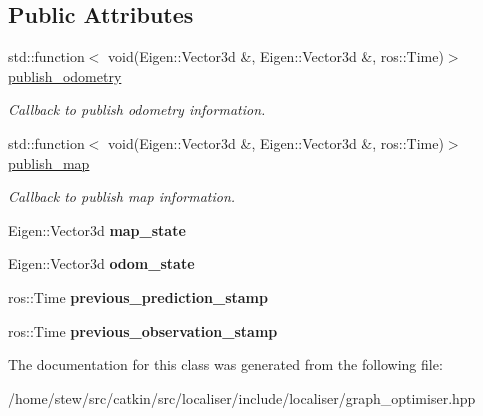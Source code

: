 \subsection*{Public Attributes}
\begin{DoxyCompactItemize}
\item 
\mbox{\label{classLocalisationMethod_a0a86db738ecb379804ed9d76de46ffb9}} 
std\+::function$<$ void(Eigen\+::\+Vector3d \&, Eigen\+::\+Vector3d \&, ros\+::\+Time)$>$ \hyperlink{classLocalisationMethod_a0a86db738ecb379804ed9d76de46ffb9}{publish\+\_\+odometry}
\begin{DoxyCompactList}\small\item\em Callback to publish odometry information. \end{DoxyCompactList}\item 
\mbox{\label{classLocalisationMethod_a51eb7bef9c72bb0cd2e9331ad3080110}} 
std\+::function$<$ void(Eigen\+::\+Vector3d \&, Eigen\+::\+Vector3d \&, ros\+::\+Time)$>$ \hyperlink{classLocalisationMethod_a51eb7bef9c72bb0cd2e9331ad3080110}{publish\+\_\+map}
\begin{DoxyCompactList}\small\item\em Callback to publish map information. \end{DoxyCompactList}\item 
\mbox{\label{classLocalisationMethod_a18a06e2d38902635f797d09df562d915}} 
Eigen\+::\+Vector3d {\bfseries map\+\_\+state}
\item 
\mbox{\label{classLocalisationMethod_a0b6e83804c6756388ed8887d1840d67f}} 
Eigen\+::\+Vector3d {\bfseries odom\+\_\+state}
\item 
\mbox{\label{classLocalisationMethod_aa0b84506c1eb7a791f3700b7c06bc4e2}} 
ros\+::\+Time {\bfseries previous\+\_\+prediction\+\_\+stamp}
\item 
\mbox{\label{classLocalisationMethod_a7f89f517fd94361ceb6e42043d788f88}} 
ros\+::\+Time {\bfseries previous\+\_\+observation\+\_\+stamp}
\end{DoxyCompactItemize}


The documentation for this class was generated from the following file\+:\begin{DoxyCompactItemize}
\item 
/home/stew/src/catkin/src/localiser/include/localiser/graph\+\_\+optimiser.\+hpp\end{DoxyCompactItemize}
